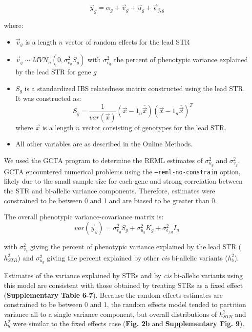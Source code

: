 \begin{equation}
\vec{y}_g = \alpha_g + \vec{v}_g + \vec{u}_g + \vec{\epsilon}_{j,g}
\end{equation}

where:
\begin{itemize}
\item $\vec{v}_g$ is a length $n$ vector of random effects for the lead STR
\item $\vec{v}_g \sim MVN_n(0, \sigma^2_{v_g}S_g)$ with $\sigma^2_{v_g}$ the percent of phenotypic variance explained by the lead STR for gene $g$
\item $S_g$ is a standardized IBS relatedness matrix constructed using the lead STR. It was constructed as:
\begin{equation}
S_g = \frac{1}{var(\vec{x})}(\vec{x}-1_n\overline{\vec{x}})(\vec{x}-1_n\overline{\vec{x}})^T
\end{equation}
where $\vec{x}$ is a length $n$ vector consisting of genotypes for the lead STR.
\item All other variables are as described in the Online Methods.
\end{itemize}

We used the GCTA program \cite{YangLeeGoddardEtAl2011} to determine the REML estimates of $\sigma^2_{u_g}$ and $\sigma^2_{v_g}$. GCTA encountered numerical problems using the \texttt{--reml-no-constrain} option, likely due to the small sample size for each gene and strong correlation between the STR and bi-allelic variance components. Therefore, estimates were constrained to be between 0 and 1 and are biased to be greater than 0.

The overall phenotypic variance-covariance matrix is:
\begin{equation}
var(\vec{y}_g) = \sigma^2_{v_g}S_g + \sigma^2_{u_g}K_g + \sigma^2_{\epsilon_{j,g}} I_n
\end{equation}

with $\sigma^2_{v_g}$ giving the percent of phenotypic variance explained by the lead STR ($h^2_{STR}$) and $\sigma^2_{u_g}$ giving the percent explained by other \emph{cis} bi-allelic variants ($h^2_{b}$).

Estimates of the variance explained by STRs and by \emph{cis} bi-allelic variants using this model are consistent with those obtained by treating STRs as a fixed effect (\textbf{Supplementary Table 6-7}). Because the random effects estimates are constrained to be between 0 and 1, the random effects model tended to partition variance all to a single variance component, but overall distributions of $h^2_{STR}$ and $h^2_{b}$ were similar to the fixed effects case (\textbf{Fig. 2b} and \textbf{Supplementary Fig. 9}).

